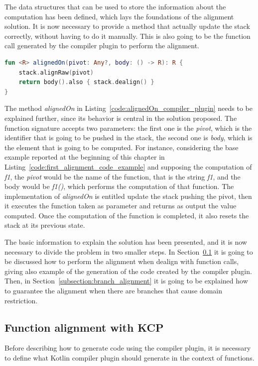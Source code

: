 The data structures that can be used to store the information about the computation has been defined, which lays the foundations of the alignment solution. It is now necessary to provide a method that actually update the stack correctly, without having to do it manually. This is also going to be the function call generated by the compiler plugin to perform the alignment.
\begin{lstlisting}[caption={Function that perfoms the alignment in the Kotlin compiler plugin solution}, captionpos=b, language=Kotlin, label={code:alignedOn_compiler_plugin}]
fun <R> alignedOn(pivot: Any?, body: () -> R): R {
    stack.alignRaw(pivot)
    return body().also { stack.dealign() }
}
\end{lstlisting}
The method \textit{alignedOn} in Listing~\ref{code:alignedOn_compiler_plugin} needs to be explained further, since its behavior is central in the solution proposed.\newline
The function signature accepts two parameters: the first one is the \textit{pivot}, which is the identifier that is going to be pushed in the stack, the second one is \textit{body}, which is the element that is going to be computed.\newline
For instance, considering the base example reported at the beginning of this chapter in Listing~\ref{code:first_alignment_code_example} and supposing the computation of \textit{f1}, the \textit{pivot} would be the name of the function, that is the string \textit{f1}, and the body would be \textit{f1()}, which performs the computation of that function.\newline
The implementation of \textit{alignedOn} is entitled update the stack pushing the pivot, then it executes the function taken as parameter and returns as output the value computed. Once the computation of the function is completed, it also resets the stack at its previous state.

The basic information to explain the solution has been presented, and it is now necessary to divide the problem in two smaller steps. In Section~\ref{subsection:function_alignment} it is going to be discussed how to perform the alignment when dealign with function calls, giving also example of the generation of the code created by the compiler plugin. Then, in Section~\ref{subsection:branch_alignment} it is going to be explained how to guarantee the alignment when there are branches that cause domain restriction.

\subsection{Function alignment with KCP}\label{subsection:function_alignment}
Before describing how to generate code using the compiler plugin, it is necessary to define what Kotlin compiler plugin should generate in the context of functions.

